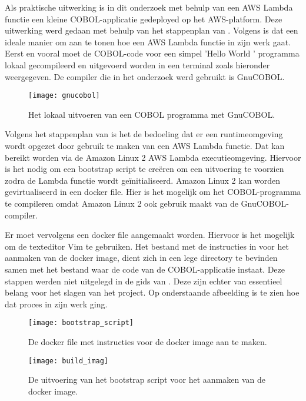 \newpage

Als praktische uitwerking is in dit onderzoek met behulp van een AWS Lambda functie een kleine COBOL-applicatie gedeployed op het AWS-platform. Deze uitwerking werd gedaan met behulp van het stappenplan van \textcite{Paika2020}. Volgens \textcite{Paika2020} is dat een ideale manier om aan te tonen hoe een AWS Lambda functie in zijn werk gaat. Eerst en vooral moet de COBOL-code voor een simpel 'Hello World ' programma lokaal gecompileerd en uitgevoerd worden in een terminal zoals hieronder weergegeven. De compiler die in het onderzoek werd gebruikt is GnuCOBOL.  
    \begin{figure}[h]
        \centering
        \texttt{[image: gnucobol]}
        \caption{Het lokaal uitvoeren van een COBOL programma met GnuCOBOL.}
     \end{figure}
 
 \newpage
 
 Volgens het stappenplan van \textcite{Paika2020} is het de bedoeling dat er een runtimeomgeving wordt opgezet door gebruik te maken van een AWS Lambda functie. Dat kan bereikt worden via de Amazon Linux 2 AWS Lambda executieomgeving. Hiervoor is het nodig om een bootstrap script te creëren om een uitvoering te voorzien zodra de Lambda functie wordt geïnitialiseerd. Amazon Linux 2 kan worden gevirtualiseerd in een docker file. Hier is het mogelijk om het COBOL-programma te compileren omdat Amazon Linux 2 ook gebruik maakt van de  GnuCOBOL-compiler. 
 
 Er moet vervolgens een docker file aangemaakt worden. Hiervoor is het mogelijk om de texteditor Vim te gebruiken. Het bestand met de instructies in voor het aanmaken van de docker image, dient zich in een lege directory te bevinden samen met het bestand waar de code van de COBOL-applicatie instaat. Deze stappen werden niet uitgelegd in de gids van \textcite{Paika2020}. Deze zijn echter van essentieel belang voor het slagen van het project. Op onderstaande afbeelding is te zien hoe dat proces in zijn werk ging. 
 
  \begin{figure}[h]
     \centering
     \texttt{[image: bootstrap\_script]}
     \caption{De docker file met instructies voor de docker image aan te maken.}
 \end{figure}

  \begin{figure}[h]
    \centering
    \texttt{[image: build\_imag]}
    \caption{De uitvoering van het bootstrap script voor het aanmaken van de docker image.}
\end{figure}

